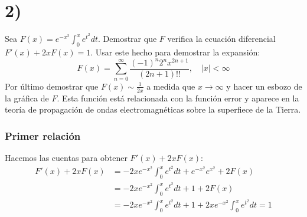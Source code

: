 \documentclass{article}
\begin{document}
\section*{2)}
Sea $F(x) = e^{-x^2}\int_{0}^{x}e^{t^2}dt$. Demostrar que $F$ verifica la ecuación diferencial 
$F'(x) + 2xF(x) = 1$. Usar este hecho para demostrar la expansión:
\[ F(x) = \sum_{n=0}^\infty \frac{(-1)^n2^nx^{2n+1}}{(2n+1)!!}, \quad  \Big|x \Big| < \infty \]
Por último demostrar que $F(x) \sim \frac{1}{2x}$ a medida que $x \to \infty$ y hacer un esbozo
de la gráfica de $F$. Esta función está relacionada con la función error y aparece en la teoría de 
propagación de ondas electromagnéticas sobre la superfiece de la Tierra.
\begin{tcolorbox}[breakable]
    \subsubsection*{Primer relación}
    Hacemos las cuentas para obtener $F'(x) + 2xF(x)$:
    \begin{align*}
        F'(x) + 2xF(x) 
        &= -2xe^{-x^2}\int_0^x e^{t^2}dt + e^{-x^2}e^{x^2} + 2F(x) \\
        &= -2xe^{-x^2}\int_0^x e^{t^2}dt + 1 + 2F(x) \\
        &= -2xe^{-x^2}\int_0^x e^{t^2}dt + 1 + 2xe^{-x^2}\int_{0}^x e^{t^2} dt = 1 
    \end{align*}

\end{tcolorbox}
\end{document}
